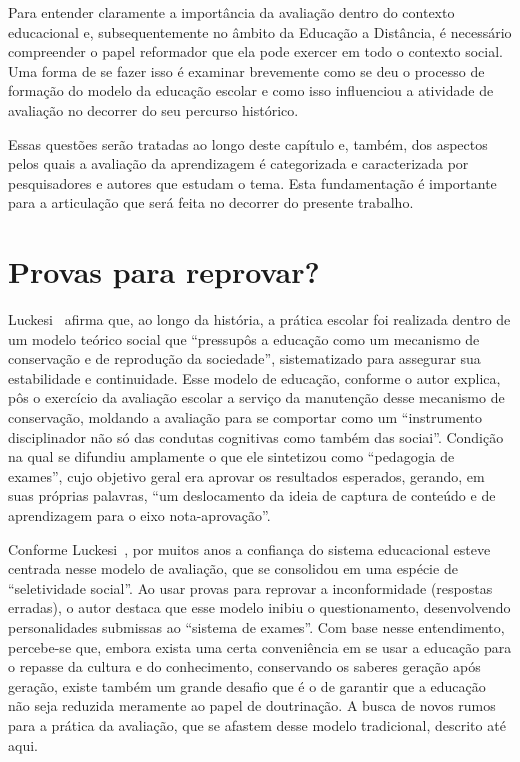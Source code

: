 \label{chap:ref}
Para entender claramente a importância da avaliação dentro do contexto educacional e, subsequentemente no âmbito da Educação a Distância, é necessário compreender o papel reformador que ela pode exercer em todo o contexto social. Uma forma de se fazer isso é examinar brevemente como se deu o processo de formação do modelo da educação escolar e como isso influenciou a atividade de avaliação no decorrer do seu percurso histórico. 


Essas questões serão tratadas ao longo deste capítulo e, também, dos aspectos pelos quais a avaliação da aprendizagem é categorizada e caracterizada por pesquisadores e autores que estudam o tema. Esta fundamentação é importante para a articulação que será feita no decorrer do presente trabalho.%

\section{Provas para reprovar?}%
 Luckesi~\cite{luckesi2014avaliaccao} afirma que, ao longo da história, a prática escolar foi realizada dentro de um modelo teórico social que ``pressupôs a educação como um mecanismo de conservação e de reprodução da sociedade'', sistematizado para assegurar sua estabilidade e continuidade. Esse modelo de educação, conforme o autor explica, pôs o exercício da avaliação escolar a serviço da manutenção desse mecanismo de conservação, moldando a avaliação para se comportar como um ``instrumento disciplinador não só das condutas cognitivas como também das sociai''. Condição na qual se difundiu amplamente o que ele sintetizou como ``pedagogia de exames'', cujo objetivo geral era aprovar os resultados esperados, gerando, em suas próprias palavras, ``um deslocamento da ideia de captura de conteúdo e de aprendizagem para o eixo nota-aprovação''.

Conforme Luckesi~\cite{luckesi2014avaliaccao}, por muitos anos a confiança do sistema educacional esteve centrada nesse modelo de avaliação, que se consolidou em uma espécie de ``seletividade social''. Ao usar provas para reprovar a inconformidade (respostas erradas), o autor destaca que esse modelo inibiu o questionamento, desenvolvendo personalidades submissas ao ``sistema de exames''. Com base nesse entendimento, percebe-se que, embora exista uma certa conveniência em se usar a educação para o repasse da cultura e do conhecimento, conservando os saberes geração após geração, existe também um grande desafio que é o de garantir que a educação não seja reduzida meramente ao papel de doutrinação. A busca de novos rumos para a prática da avaliação, que se afastem desse modelo tradicional, descrito até aqui. 

